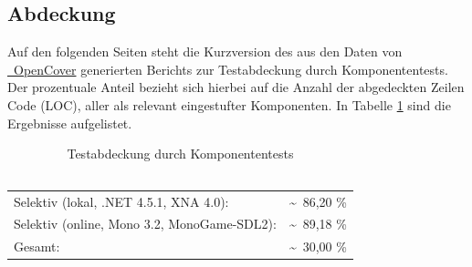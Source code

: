 %



\subsection{Abdeckung}
\label{Abschnitt:Tests:Statistik:Abdeckung}

\newcommand\VSLocalCoverage{\textasciitilde~86,20 \%}

\newcommand\OnlineLocalCoverage{\textasciitilde~89,18 \%}

\newcommand\VSGlobalCoverage{\textasciitilde~30,00 \%}

Auf den folgenden Seiten steht die Kurzversion des aus den Daten von \hyperref[Abschnitt:Tests:Werkzeuge:Automatisiert:OpenCover]{\mousecursor~OpenCover} generierten Berichts zur Testabdeckung durch Komponententests.
Der prozentuale Anteil bezieht sich hierbei auf die Anzahl der abgedeckten Zeilen Code (LOC), aller als relevant eingestufter Komponenten. In Tabelle \ref{Abschnitt:Tests:Statistik:Abdeckung:Tabelle} sind die Ergebnisse aufgelistet.

\begin{longtable}{p{0.5\hsize}p{0.5\hsize}}

	\caption{Testabdeckung durch Komponententests\\~\\}
	\label{Abschnitt:Tests:Statistik:Abdeckung:Tabelle}
	\\

	  Selektiv (lokal, .NET 4.5.1, XNA 4.0):
	& \VSLocalCoverage \\
	
	  Selektiv (online, Mono 3.2, MonoGame-SDL2):
	& \OnlineLocalCoverage \\
	
	  Gesamt:
	& \VSGlobalCoverage \\

\end{longtable}

~\\

